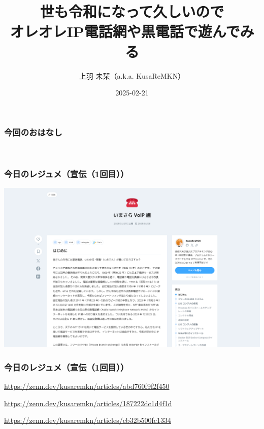 \documentclass[
  lualatex,
  aspectratio=169,
  14pt
]{beamer}
\title{世も令和になって久しいので\\オレオレIP電話網や黒電話で遊んでみる}
\author{上羽 未栞（a.k.a. KusaReMKN）}
\institute{%
  \url{https://KusaReMKN.com/}\\
  Twitter: \href{https://twitter.com/KusaReMKN}{@KusaReMKN}}
\date{2025-02-21}
\begin{document}
\begin{frame}
  \titlepage
\end{frame}

\begin{frame}
  \frametitle{今回のおはなし}

  ~\\[-.25\baselineskip]
  \tableofcontents
\end{frame}

\begin{frame}
  \frametitle{今日のレジュメ（宣伝（1回目））}

  \includegraphics[width=\linewidth]{./images/imasara.png}
\end{frame}

\begin{frame}
  \frametitle{今日のレジュメ（宣伝（1回目））}

  \begin{description}[labelwidth=\linewidth,itemsep=\zh]
    \item[いまさらVoIP網]
      {\small
      \url{https://zenn.dev/kusaremkn/articles/abd760f9f2f450}}
    \item[VoIPルータを使って黒電話をIP電話機にする]
      {\small
      \url{https://zenn.dev/kusaremkn/articles/187222dc1d4f1d}}
    \item[ICOM VE-TA10を使うためにパケットを書き換えたりする]
      {\small
      \url{https://zenn.dev/kusaremkn/articles/cb32b500fc1334}}
  \end{description}
\end{frame}
\end{document}
